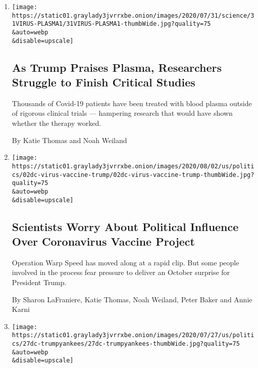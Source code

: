 \begin{enumerate}
\def\labelenumi{\arabic{enumi}.}
\item
  \href{/2020/08/04/health/trump-plasma.html}{}

  \texttt{[image: https://static01.graylady3jvrrxbe.onion/images/2020/07/31/science/31VIRUS-PLASMA1/31VIRUS-PLASMA1-thumbWide.jpg?quality=75\\\&auto=webp\\\&disable=upscale]}

  \hypertarget{as-trump-praises-plasma-researchers-struggle-to-finish-critical-studies}{%
  \subsection{As Trump Praises Plasma, Researchers Struggle to Finish
  Critical
  Studies}\label{as-trump-praises-plasma-researchers-struggle-to-finish-critical-studies}}

  Thousands of Covid-19 patients have been treated with blood plasma
  outside of rigorous clinical trials --- hampering research that would
  have shown whether the therapy worked.

  By Katie Thomas and Noah Weiland
\item
  \href{/2020/08/02/us/politics/coronavirus-vaccine.html}{}

  \texttt{[image: https://static01.graylady3jvrrxbe.onion/images/2020/08/02/us/politics/02dc-virus-vaccine-trump/02dc-virus-vaccine-trump-thumbWide.jpg?quality=75\\\&auto=webp\\\&disable=upscale]}

  \hypertarget{scientists-worry-about-political-influence-over-coronavirus-vaccine-project}{%
  \subsection{Scientists Worry About Political Influence Over
  Coronavirus Vaccine
  Project}\label{scientists-worry-about-political-influence-over-coronavirus-vaccine-project}}

  Operation Warp Speed has moved along at a rapid clip. But some people
  involved in the process fear pressure to deliver an October surprise
  for President Trump.

  By Sharon LaFraniere, Katie Thomas, Noah Weiland, Peter Baker and
  Annie Karni
\item
  \href{/2020/07/27/us/politics/trump-yankees-fauci.html}{}

  \texttt{[image: https://static01.graylady3jvrrxbe.onion/images/2020/07/27/us/politics/27dc-trumpyankees/27dc-trumpyankees-thumbWide.jpg?quality=75\\\&auto=webp\\\&disable=upscale]}


\end{enumerate}
